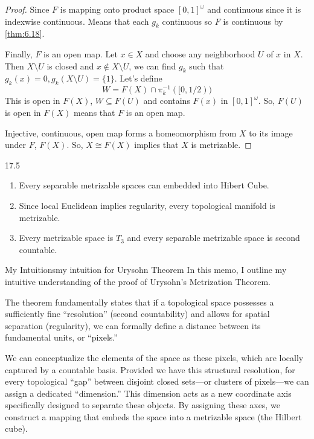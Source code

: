 \documentclass[12pt, a4paper, twoside]{article}
\theoremstyle{plain}
\begin{document}
\begin{proof}
    Since $F$ is mapping onto product space $[0,1]^\omega$ and continuous since it is indexwise continuous. Means that 
    each $g_k$ continuous so $F$ is continuous by \ref{thm:6.18}. 

    Finally, $F$ is an open map. Let $x \in X$ and choose any neighborhood $U$ of $x$ in $X$. 
    Then $X \setminus U$ is closed and $x \notin X \setminus U$, we can find $g_k$ such that 
    $g_k(x) = 0, g_k(X \setminus U) = \{1\}$. 
    Let's define 
    \[W = F(X) \cap \pi_{k}^{-1}([0,1/2))\]
    This is open in $F(X)$, $W \subseteq F(U)$ and contains $F(x)$ in $[0,1]^\omega$. 
    So, $F(U)$ is open in $F(X)$ means that $F$ is an open map. 

    Injective, continuous, open map forms a homeomorphism from $X$ to its image under $F$, $F(X)$. 
    So, $X \cong F(X)$ implies that $X$ is metrizable. 
\end{proof}

\begin{rem}{}{17.5}
    \begin{enumerate}
        \item Every separable metrizable spaces can embedded into Hibert Cube. 
        \item Since local Euclidean implies regularity, every topological manifold is metrizable. 
        \item Every metrizable space is $T_3$ and every separable metrizable space is second countable. 
    \end{enumerate}
\end{rem}

\begin{rem}{My Intuitions}{my intuition for Urysohn Theorem}
    In this memo, I outline my intuitive understanding of the proof of Urysohn's Metrization Theorem. 

The theorem fundamentally states that if a topological space possesses a sufficiently fine ``resolution'' (second countability) and allows for spatial separation (regularity), we can formally define a distance between its fundamental units, or ``pixels.'' 

We can conceptualize the elements of the space as these pixels, which are locally captured by a countable basis. Provided we have this structural resolution, for every topological ``gap'' between disjoint closed sets---or clusters of pixels---we can assign a dedicated ``dimension.'' This dimension acts as a new coordinate axis specifically designed to separate these objects. By assigning these axes, we construct a mapping that embeds the space into a metrizable space (the Hilbert cube).
\end{rem}
\end{document}
